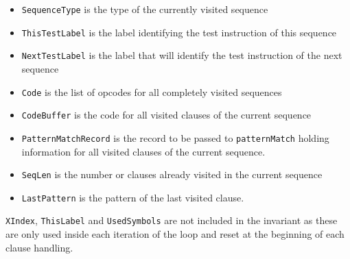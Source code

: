 \documentclass[a4paper]{memoir}
\begin{document}
\begin{itemize}
  \item \lstinline!SequenceType! is the type of the currently visited sequence 
  \item \lstinline!ThisTestLabel! is the label identifying the test instruction of this sequence
  \item \lstinline!NextTestLabel! is the label that will identify the test
    instruction of the next sequence
  \item \lstinline!Code! is the list of opcodes for all completely visited sequences
  \item \lstinline!CodeBuffer! is the code for all visited clauses of the current sequence
  \item \lstinline!PatternMatchRecord! is the record to be passed to \lstinline!patternMatch!
        holding information for all visited clauses of the current sequence.
  \item \lstinline!SeqLen! is the number or clauses already visited in the current sequence
  \item \lstinline!LastPattern! is the pattern of the last visited clause.
\end{itemize}

\lstinline!XIndex!, \lstinline!ThisLabel! and \lstinline!UsedSymbols! are not
included in the invariant as these are only used inside
each iteration of the loop and reset at the beginning of each clause handling.
\end{document}
